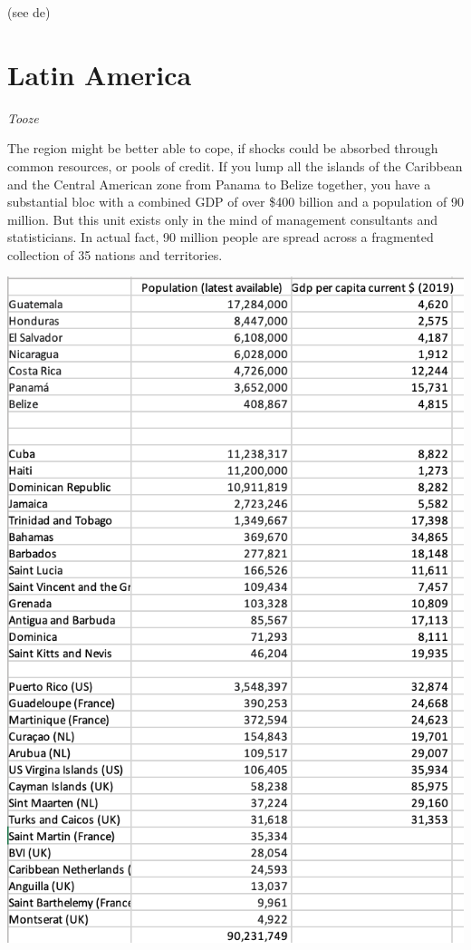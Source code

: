 \documentclass[
]{book}
\begin{document}
(see de)

\hypertarget{latin-america}{%
\section{Latin America}\label{latin-america}}

\emph{Tooze}

The region might be better able to cope, if shocks could be absorbed through common resources, or pools of credit. If you lump all the islands of the Caribbean and the Central American zone from Panama to Belize together, you have a substantial bloc with a combined GDP of over \$400 billion and a population of 90 million. But this unit exists only in the mind of management consultants and statisticians. In actual fact, 90 million people are spread across a fragmented collection of 35 nations and territories.

\includegraphics{fig/pop_gdp_central_america_caribbean.png}
\end{document}
